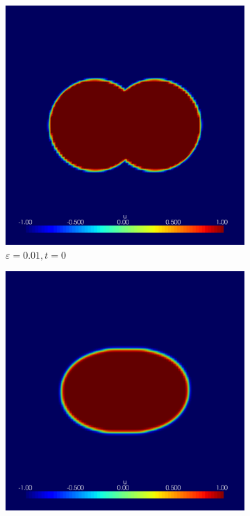 \begin{figure}[h]
	\begin{subfigure}[b]{0.3\linewidth}
		\includegraphics[width=\linewidth]{numerical_simulation/dumbel/eps_0.01000000.vtu}
		\caption{$ \varepsilon = 0.01, t = 0 $}
	\end{subfigure}
	\hfill
	\begin{subfigure}[b]{0.3\linewidth}
		\includegraphics[width=\linewidth]{numerical_simulation/dumbel/eps_0.01000015.vtu}

\end{subfigure}
\end{figure}
